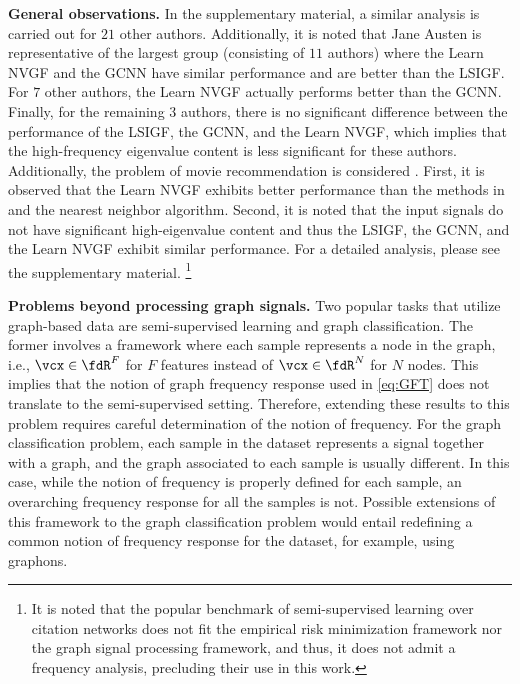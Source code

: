\textbf{General observations.} In the supplementary material, a similar analysis is carried out for $21$ other authors. Additionally, it is noted that Jane Austen is representative of the largest group (consisting of $11$ authors) where the Learn NVGF and the GCNN have similar performance and are better than the LSIGF. For $7$ other authors, the Learn NVGF actually performs better than the GCNN. Finally, for the remaining $3$ authors, there is no significant difference between the performance of the LSIGF, the GCNN, and the Learn NVGF, which implies that the high-frequency eigenvalue content is less significant for these authors.  \else Additionally, the problem of movie recommendation is considered \cite{Harper2016-MovieLens}. First, it is observed that the Learn NVGF exhibits better performance than the methods in \cite{Monti2017-RecommendationGNN, Levie2018-CayleyNets} and the nearest neighbor algorithm. Second, it is noted that the input signals do not have significant high-eigenvalue content and thus the LSIGF, the GCNN, and the Learn NVGF exhibit similar performance. For a detailed analysis, please see the supplementary material. \footnote{It is noted that the popular benchmark of semi-supervised learning over citation networks does not fit the empirical risk minimization framework nor the graph signal processing framework, and thus, it does not admit a frequency analysis, precluding their use in this work.}

\textbf{Problems beyond processing graph signals.} Two popular tasks that utilize graph-based data are semi-supervised learning and graph classification. The former involves a framework where each sample represents a node in the graph, i.e., $\vcx \in \fdR^{F}$ for $F$ features instead of $\vcx \in \fdR^{N}$ for $N$ nodes. This implies that the notion of graph frequency response used in \eqref{eq:GFT} does not translate to the semi-supervised setting. Therefore, extending these results to this problem requires careful determination of the notion of frequency. For the graph classification problem, each sample in the dataset represents a signal together with a graph, and the graph associated to each sample is usually different. In this case, while the notion of frequency is properly defined for each sample, an overarching frequency response for all the samples is not. Possible extensions of this framework to the graph classification problem would entail redefining a common notion of frequency response for the dataset, for example, using graphons.
\fi

